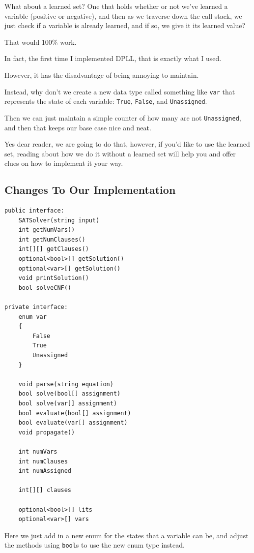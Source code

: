 What about a learned set? One that holds whether or not we've learned a
variable (positive or negative), and then as we traverse down the call stack,
we just check if a variable is already learned, and if so, we give it its learned
value?

That would 100\% work.

In fact, the first time I implemented DPLL, that is exactly what I used.

However, it has the disadvantage of being annoying to maintain.

Instead, why don't we create a new data type called something like
\texttt{var} that represents the state of each variable: \texttt{True},
\texttt{False}, and \texttt{Unassigned}.

Then we can just maintain a simple counter of how many are not
\texttt{Unassigned}, and then that keeps our base case nice and neat.

Yes dear reader, we are going to do that, however, if you'd like to use the
learned set, reading about how we do it without a learned set will help you
and offer clues on how to implement it your way.

\subsection{Changes To Our Implementation}

\begin{lstlisting}
public interface:
    SATSolver(string input)
    int getNumVars()
    int getNumClauses()
    int[][] getClauses()
    optional<bool>[] getSolution()
    optional<var>[] getSolution()
    void printSolution()
    bool solveCNF()

private interface:
    enum var
    {
        False
        True
        Unassigned
    }

    void parse(string equation)
    bool solve(bool[] assignment)
    bool solve(var[] assignment)
    bool evaluate(bool[] assignment)
    bool evaluate(var[] assignment)
    void propagate()

    int numVars
    int numClauses
    int numAssigned

    int[][] clauses

    optional<bool>[] lits
    optional<var>[] vars
\end{lstlisting}

Here we just add in a new enum for the states that a variable can be, and
adjust the methods using \texttt{bool}s to use the new enum type instead.

